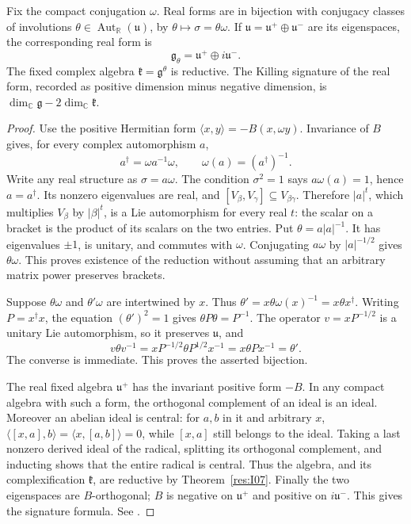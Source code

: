 \begin{theorem}\label{res:J04}
Fix the compact conjugation \(\omega\). Real forms are in bijection
with conjugacy classes of involutions
\(\theta\in\operatorname{Aut}_{\mathbb R}(\mathfrak u)\), by
\(\theta\mapsto\sigma=\theta\omega\).
If \(\mathfrak u=\mathfrak u^+\oplus\mathfrak u^-\) are its
eigenspaces, the corresponding real form is
\[
 \mathfrak g_\theta=\mathfrak u^+\oplus i\mathfrak u^-.
\]
The fixed complex algebra \(\mathfrak k=\mathfrak g^\theta\)
is reductive. The Killing signature of the real form, recorded
as positive dimension minus negative dimension, is
\(\dim_{\mathbb C}\mathfrak g-2\dim_{\mathbb C}\mathfrak k\).
\end{theorem}
\begin{proof}
Use the positive Hermitian form
\(\langle x,y\rangle=-B(x,\omega y)\).
Invariance of \(B\) gives, for every complex automorphism \(a\),
\[
 a^\dagger=\omega a^{-1}\omega,\qquad
 \omega(a)=(a^\dagger)^{-1}.
\]
Write any real structure as \(\sigma=a\omega\).
The condition \(\sigma^2=1\) says \(a\omega(a)=1\), hence
\(a=a^\dagger\). Its nonzero eigenvalues are real, and
\([V_\beta,V_\gamma]\subseteq V_{\beta\gamma}\).
Therefore \(|a|^t\), which multiplies \(V_\beta\) by
\(|\beta|^t\), is a Lie automorphism for every real \(t\):
the scalar on a bracket is the product of its scalars on the
two entries. Put \(\theta=a|a|^{-1}\).
It has eigenvalues \(\pm1\), is unitary, and commutes with
\(\omega\). Conjugating \(a\omega\) by \(|a|^{-1/2}\) gives
\(\theta\omega\). This proves existence of the reduction
without assuming that an arbitrary matrix power preserves brackets.

Suppose \(\theta\omega\) and \(\theta'\omega\) are intertwined
by \(x\). Thus \(\theta'=x\theta\omega(x)^{-1}=x\theta x^\dagger\).
Writing \(P=x^\dagger x\), the equation \((\theta')^2=1\)
gives \(\theta P\theta=P^{-1}\).
The operator \(v=xP^{-1/2}\) is a unitary Lie automorphism,
so it preserves \(\mathfrak u\), and
\[
 v\theta v^{-1}=xP^{-1/2}\theta P^{1/2}x^{-1}
              =x\theta P x^{-1}=\theta'.
\]
The converse is immediate. This proves the asserted bijection.

The real fixed algebra \(\mathfrak u^+\) has the invariant positive
form \(-B\). In any compact algebra with such a form, the
orthogonal complement of an ideal is an ideal. Moreover an
abelian ideal is central: for \(a,b\) in it and arbitrary \(x\),
\(\langle[x,a],b\rangle=\langle x,[a,b]\rangle=0\), while
\([x,a]\) still belongs to the ideal. Taking a last nonzero
derived ideal of the radical, splitting its orthogonal complement,
and inducting shows that the entire radical is central.
Thus the algebra, and its complexification \(\mathfrak k\),
are reductive by Theorem~\ref{res:I07}.
Finally the two eigenspaces are \(B\)-orthogonal;
\(B\) is negative on \(\mathfrak u^+\) and positive on
\(i\mathfrak u^-\). This gives the signature formula.
See \cite[Theorem 41.5]{etingof}.
\end{proof}

